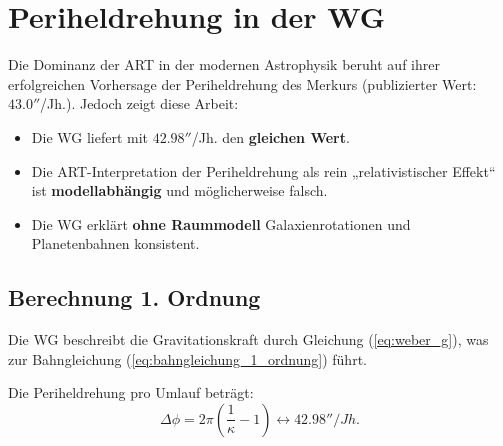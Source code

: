 \section{Periheldrehung in der WG}
Die Dominanz der ART in der modernen Astrophysik beruht auf ihrer erfolgreichen Vorhersage der Periheldrehung des Merkurs \cite{einstein1915} (publizierter Wert: $43.0''$/Jh.). Jedoch zeigt diese Arbeit:
\begin{itemize}
    \item Die WG liefert mit $42.98''$/Jh. den \textbf{gleichen Wert}.
    \item Die ART-Interpretation der Periheldrehung als rein „relativistischer Effekt“ ist \textbf{modellabhängig} und möglicherweise falsch.
    \item Die WG erklärt \textbf{ohne Raummodell} Galaxienrotationen und Planetenbahnen konsistent.
\end{itemize}

\subsection{Berechnung 1. Ordnung}
Die WG beschreibt die Gravitationskraft durch Gleichung (\ref{eq:weber_g}), was zur Bahngleichung (\ref{eq:bahngleichung_1_ordnung}) führt.

Die Periheldrehung pro Umlauf beträgt:
\begin{equation}
\Delta\phi = 2\pi\left(\frac{1}{\kappa} - 1\right) \leftrightarrow 42.98'' /Jh.
\end{equation}
